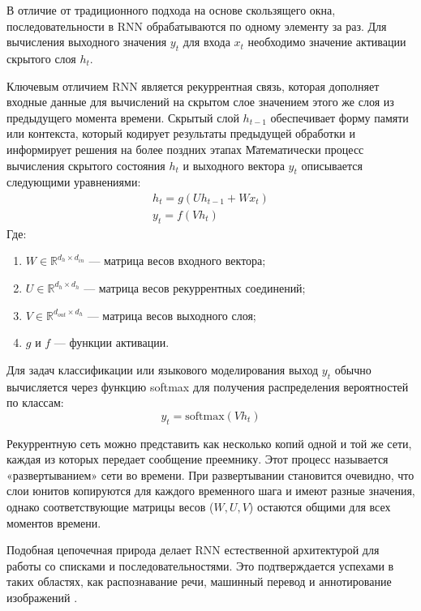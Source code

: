 \documentclass[coursework]{SCWorks}
\begin{document}
    В отличие от традиционного подхода на основе скользящего окна, последовательности в RNN обрабатываются по одному элементу за раз. Для вычисления выходного значения $y_t$ для входа $x_t$ необходимо значение активации скрытого слоя $h_t$.


    Ключевым отличием RNN является рекуррентная связь,
    которая дополняет входные данные для вычислений на скрытом слое значением этого же слоя из предыдущего
    момента времени.
    Скрытый слой $h_{t-1}$ обеспечивает форму памяти или контекста,
    который кодирует результаты предыдущей обработки и информирует решения на более поздних этапах \.


    Математически процесс вычисления скрытого состояния $h_t$ и выходного вектора $y_t$ описывается следующими
    уравнениями:
    \begin{gather*}
        h_t = g(U h_{t-1} + W x_t)\\
        y_t = f(V h_t)
    \end{gather*}
    Где:
    \begin{enumerate}
        \item $W \in \mathbb{R}^{d_h \times d_{in}}$ — матрица весов входного вектора;
        \item $U \in \mathbb{R}^{d_h \times d_h}$ — матрица весов рекуррентных соединений;
        \item $V \in \mathbb{R}^{d_{out} \times d_h}$ — матрица весов выходного слоя;
        \item $g$ и $f$ — функции активации.
    \end{enumerate}

    Для задач классификации или языкового моделирования выход $y_t$ обычно вычисляется через функцию
    softmax для получения распределения вероятностей по классам:
    \[y_t = \text{softmax}(V h_t)\]

    Рекуррентную сеть можно представить как несколько копий одной и той же сети,
    каждая из которых передает сообщение преемнику.
    Этот процесс называется «развертыванием» сети во времени.
    При развертывании становится очевидно, что слои юнитов копируются для каждого временного шага
    и имеют разные значения, однако соответствующие матрицы весов ($W, U, V$) остаются общими
    для всех моментов времени.

    Подобная цепочечная природа делает RNN естественной архитектурой для работы со списками и последовательностями.
    Это подтверждается успехами в таких областях, как распознавание речи,
    машинный перевод и аннотирование изображений \cite{jm3}.
\end{document}
